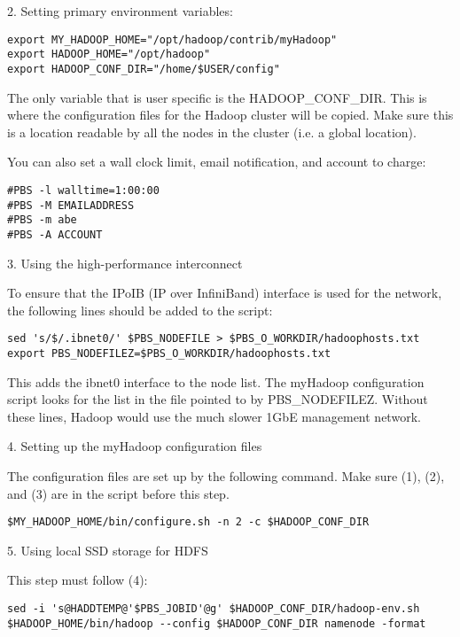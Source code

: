 2. Setting primary environment variables:

\begin{verbatim}
export MY_HADOOP_HOME="/opt/hadoop/contrib/myHadoop"
export HADOOP_HOME="/opt/hadoop"
export HADOOP_CONF_DIR="/home/$USER/config"
\end{verbatim}

The only variable that is user specific is the HADOOP_CONF_DIR. This
is where the configuration files for the Hadoop cluster will be
copied. Make sure this is a location readable by all the nodes in the
cluster (i.e. a global location).

You can also set a wall clock limit, email notification, and account
to charge:

\begin{verbatim}
#PBS -l walltime=1:00:00
#PBS -M EMAILADDRESS
#PBS -m abe
#PBS -A ACCOUNT
\end{verbatim}

3. Using the high-performance interconnect

To ensure that the IPoIB (IP over InfiniBand) interface is used for
the network, the following lines should be added to the script:

\begin{verbatim}
sed 's/$/.ibnet0/' $PBS_NODEFILE > $PBS_O_WORKDIR/hadoophosts.txt
export PBS_NODEFILEZ=$PBS_O_WORKDIR/hadoophosts.txt
\end{verbatim}

This adds the ibnet0 interface to the node list. The myHadoop
configuration script looks for the list in the file pointed to by
PBS_NODEFILEZ. Without these lines, Hadoop would use the much slower
1GbE management network.

4. Setting up the myHadoop configuration files

The configuration files are set up by the following command. Make sure
(1), (2), and (3) are in the script before this step.

\begin{verbatim}
$MY_HADOOP_HOME/bin/configure.sh -n 2 -c $HADOOP_CONF_DIR
\end{verbatim}

5. Using local SSD storage for HDFS

This step must follow (4):
\begin{verbatim}
sed -i 's@HADDTEMP@'$PBS_JOBID'@g' $HADOOP_CONF_DIR/hadoop-env.sh
$HADOOP_HOME/bin/hadoop --config $HADOOP_CONF_DIR namenode -format
\end{verbatim}

